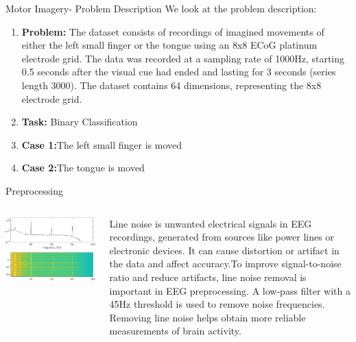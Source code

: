 \begin{frame}{Motor Imagery- Problem Description}
    We look at the problem description:
    \begin{enumerate}[$\bullet$]
        \item \textbf{Problem:} The dataset consists of recordings of imagined movements of either the left small finger or the tongue using an 8x8 ECoG platinum electrode grid. The data was recorded at a sampling rate of 1000Hz, starting 0.5 seconds after the visual cue had ended and lasting for 3 seconds (series length 3000). The dataset contains 64 dimensions, representing the 8x8 electrode grid.\pause
        \item \textbf{Task:} Binary Classification\pause
        \item \textbf{Case 1:}The left small finger is moved\pause
        \item  \textbf{Case 2:}The tongue is moved
    \end{enumerate}
\end{frame}
\begin{frame}{Preprocessing}
    \begin{columns}[T]
    \begin{column}{0.6\textwidth}
      \includegraphics[width=\textwidth]{images/line.jpg}
    \end{column}
    \begin{column}{0.45\textwidth}
    Line noise is unwanted electrical signals in EEG recordings, generated from sources like power lines or electronic devices. It can cause distortion or artifact in the data and affect accuracy.\pause To improve signal-to-noise ratio and reduce artifacts, line noise removal is important in EEG preprocessing. A low-pass filter with a 45Hz threshold is used to remove noise frequencies. Removing line noise helps obtain more reliable measurements of brain activity.
    \end{column}
  \end{columns}
\end{frame}
